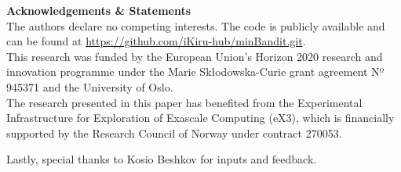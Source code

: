 
\hfill \break
\vspace {0.2cm}

\noindent \textbf{Acknowledgements \& Statements}\\
The authors declare no competing interests.
\hfill \break
The code is publicly available and can be found at
\url{https://github.com/iKiru-hub/minBandit.git}.\\
This research was funded by the European Union’s Horizon 2020 research and innovation programme under the Marie Skłodowska-Curie grant agreement Nº 945371 and the University of Oslo. \\
The research presented in this paper has benefited from the Experimental Infrastructure for Exploration of Exascale Computing (eX3), which is financially supported by the Research Council of Norway under contract 270053.

\noindent Lastly, special thanks to Kosio Beshkov for inputs and feedback.

\vspace {0.3cm}

